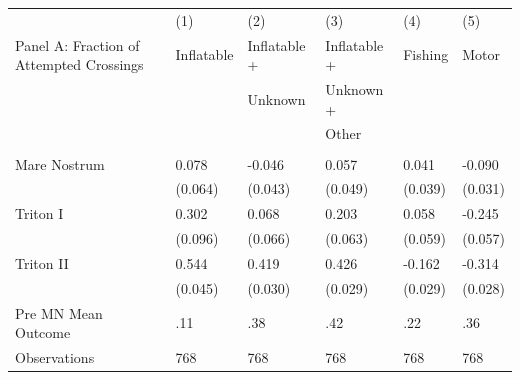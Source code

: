 \begin{tabular}{p{7cm}C{3cm}C{3cm}C{3cm}C{3cm}C{3cm}} \toprule\toprule   & (1)         & (2)       & (3)     & (4)      & (5)       \\ Panel A: Fraction of Attempted Crossings       & Inflatable   & Inflatable + & Inflatable + & Fishing & Motor                     \\                                            &    & Unknown & Unknown + &  &                      \\                                            &    &  & Other &  &                      \\ \hline                          &        &       &          &     &                           \\ 
Mare Nostrum        &       0.078&      -0.046&       0.057&       0.041&      -0.090\\
                    &     (0.064)&     (0.043)&     (0.049)&     (0.039)&     (0.031)\\
Triton I            &       0.302&       0.068&       0.203&       0.058&      -0.245\\
                    &     (0.096)&     (0.066)&     (0.063)&     (0.059)&     (0.057)\\
Triton II           &       0.544&       0.419&       0.426&      -0.162&      -0.314\\
                    &     (0.045)&     (0.030)&     (0.029)&     (0.029)&     (0.028)\\
         \midrule Pre MN Mean Outcome  & .11 & .38 & .42 & .22 & .36 \\         
Observations        &         768&         768&         768&         768&         768\\
         \bottomrule         \end{tabular}         
